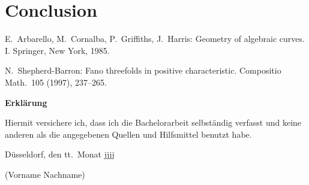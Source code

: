 \documentclass[12pt,titlepage,a4paper]{article}
\begin{document}
\pagebreak

\section{Conclusion}

\begin{thebibliography}{ccccc}

E.\ Arbarello, M.\ Cornalba, P.\ Griffiths, J.\ Harris:
Geometry of algebraic curves. I. 
Springer, New York, 1985.

N.\ Shepherd-Barron:
Fano threefolds in positive characteristic.
Compositio Math.\  105  (1997),  237--265.

\end{thebibliography}



\pagebreak\noindent
\textbf{\LARGE Erkl\"arung}

\bigskip\bigskip
\noindent 
Hiermit versichere ich, dass ich die   Bachelorarbeit selbst\"andig verfasst und keine
anderen als die angegebenen Quellen und Hilfsmittel benutzt habe.

\bigskip
\noindent
D\"usseldorf, den tt.\ Monat jjjj

\bigskip\bigskip\bigskip
\noindent
(Vorname Nachname)
\end{document}
